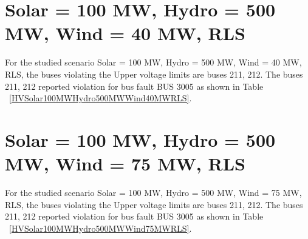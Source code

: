 \documentclass[10pt]{report}
\begin{document}
\section{Solar = 100 MW, Hydro = 500 MW, Wind = 40 MW, RLS}
For the studied scenario Solar = 100 MW, Hydro = 500 MW, Wind = 40 MW, RLS, the buses violating the Upper voltage limits are buses 211, 212.
The buses 211, 212 reported violation for bus fault BUS 3005 as shown in Table ~\ref{HVSolar100MWHydro500MWWind40MWRLS}.
\begin{table}[H]
\caption{Contingencies reporting bus voltages greater than emergency voltage of 1.1 PU for scenario Solar = 100 MW, Hydro = 500 MW, Wind = 40 MW, RLS}
\label{HVSolar100MWHydro500MWWind40MWRLS}
\centering
{}
\end{table}


\section{Solar = 100 MW, Hydro = 500 MW, Wind = 75 MW, RLS}
For the studied scenario Solar = 100 MW, Hydro = 500 MW, Wind = 75 MW, RLS, the buses violating the Upper voltage limits are buses 211, 212.
The buses 211, 212 reported violation for bus fault BUS 3005 as shown in Table ~\ref{HVSolar100MWHydro500MWWind75MWRLS}.
\begin{table}[H]
\caption{Contingencies reporting bus voltages greater than emergency voltage of 1.1 PU for scenario Solar = 100 MW, Hydro = 500 MW, Wind = 75 MW, RLS}
\label{HVSolar100MWHydro500MWWind75MWRLS}
\centering
{}
\end{table}
\end{document}
